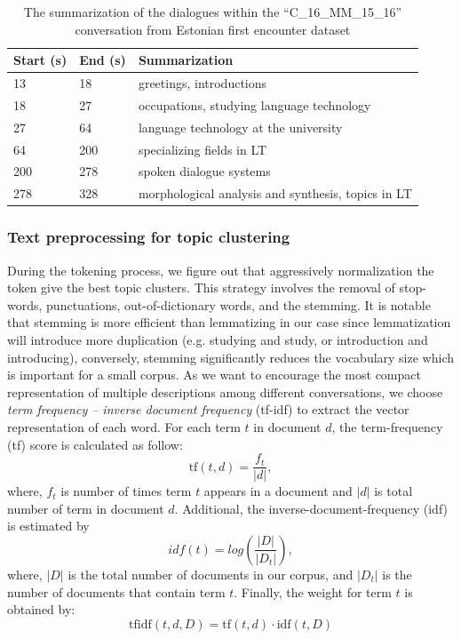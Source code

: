 \documentclass[10pt,journal,compsoc]{IEEEtran}
\begin{document}
\begin{table}[h]
\begin{center}
\begin{tabular}{|l|l|p{4cm}|}
\hline \bf Start (s) & \bf End (s) & \bf Summarization \\ \hline
13 & 18 & greetings, introductions \\ \hline
18 & 27 & occupations, studying language technology \\ \hline
27 & 64 & language technology at the university \\ \hline
64 & 200 & specializing fields in LT \\ \hline
200 & 278 & spoken dialogue systems \\ \hline
278 & 328 & morphological analysis and synthesis, topics in LT \\
\hline
\end{tabular}
\end{center}
\caption{The summarization of the dialogues within the ``C\_16\_MM\_15\_16'' conversation from Estonian first encounter dataset}
\label{tab:diagsum}
\end{table}

\subsubsection{Text preprocessing for topic clustering}
During the tokening process, we figure out that aggressively normalization the token give the best topic clusters. This strategy involves the removal of stop-words, punctuations, out-of-dictionary words, and the stemming. It is notable that stemming is more efficient than lemmatizing in our case since lemmatization will introduce more duplication (e.g. studying and study, or introduction and introducing), conversely, stemming significantly reduces the vocabulary size which is important for a small corpus. As we want to encourage the most compact representation of multiple descriptions among different conversations, we choose \textit{term frequency – inverse document frequency} (tf-idf) to extract the vector representation of each word. For each term $t$ in document $d$, the term-frequency (tf) score is calculated as follow:
\[
{\displaystyle \mathrm {tf} (t,d)= {\frac {f_t}{|d|}}},
\]
where, $f_t$ is number of times term $t$ appears in a document and $|d|$ is total number of term in document $d$. Additional, the inverse-document-frequency (idf) is estimated by
\[
idf(t) = log(\frac{|D|}{|D_t|}),
\]
where, $|D|$ is the total number of documents in our corpus, and $|D_t|$ is the number of documents that contain term $t$.
Finally, the weight for term $t$ is obtained by:
\[
{\displaystyle \mathrm {tfidf} (t,d,D)=\mathrm {tf} (t,d)\cdot \mathrm {idf} (t,D)}
\]
\end{document}
